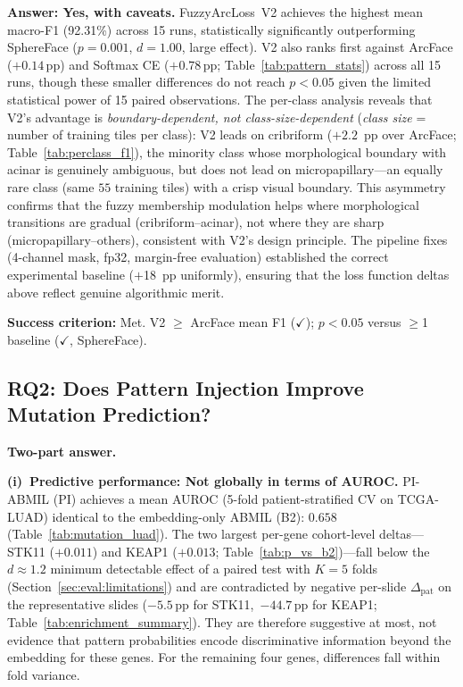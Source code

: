 \textbf{Answer: Yes, with caveats.}
FuzzyArcLoss~V2 achieves the highest mean macro-F1 (92.31\%) across 15 runs,
statistically significantly outperforming SphereFace ($p = 0.001$, $d = 1.00$, large effect).
V2 also ranks first against ArcFace ($+0.14$\,pp) and Softmax CE
($+0.78$\,pp; Table~\ref{tab:pattern_stats}) across all 15 runs, though
these smaller differences do not reach $p < 0.05$ given the limited
statistical power of 15 paired observations.
The per-class analysis reveals that V2's advantage is
\emph{boundary-dependent, not class-size-dependent} (\emph{class
size} = number of training tiles per class): V2 leads on cribriform
($+2.2$~pp over ArcFace; Table~\ref{tab:perclass_f1}), the minority class whose morphological
boundary with acinar is genuinely ambiguous, but does not lead on
micropapillary---an equally rare class (same $55$ training tiles)
with a crisp visual boundary.
This asymmetry confirms that the fuzzy membership modulation helps
where morphological transitions are gradual (cribriform--acinar),
not where they are sharp (micropapillary--others), consistent with
V2's design principle.
The pipeline fixes (4-channel mask, fp32, margin-free evaluation)
established the correct experimental baseline ($+$18~pp uniformly),
ensuring that the loss function deltas above reflect genuine
algorithmic merit.

\textbf{Success criterion:} Met. V2 $\geq$ ArcFace mean F1 ($\checkmark$);
$p < 0.05$ versus $\geq$1 baseline ($\checkmark$, SphereFace).

\subsection{RQ2: Does Pattern Injection Improve Mutation Prediction?}
\label{sec:eval:rq2}

\textbf{Two-part answer.}

\textbf{(i)~Predictive performance: Not globally in terms of AUROC.}
PI-ABMIL (PI) achieves a mean AUROC (5-fold patient-stratified CV
on TCGA-LUAD) identical to the embedding-only ABMIL (B2): $0.658$
(Table~\ref{tab:mutation_luad}).
The two largest per-gene cohort-level deltas---STK11 ($+0.011$)
and KEAP1 ($+0.013$; Table~\ref{tab:p_vs_b2})---fall below the
$d \approx 1.2$ minimum detectable effect of a paired test with
$K = 5$ folds (Section~\ref{sec:eval:limitations}) and are
contradicted by negative per-slide $\Delta_{\mathrm{pat}}$ on the
representative slides ($-5.5$\,pp for STK11,~$-44.7$\,pp for KEAP1;
Table~\ref{tab:enrichment_summary}).
They are therefore suggestive at most, not evidence that pattern
probabilities encode discriminative information beyond the
embedding for these genes.
For the remaining four genes, differences fall within fold variance.

